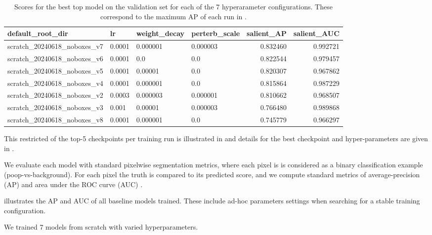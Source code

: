 \documentclass[10pt,twocolumn,letterpaper]{article}
\begin{document}
\begin{table*}[t]
\centering
\begin{tabular}{llllrr}
\toprule
                       default\_root\_dir &      lr & weight\_decay & perterb\_scale &  salient\_AP &  salient\_AUC \\
\midrule
scratch\_20240618\_noboxes\_v7 &  0.0001 &     0.000001 &      0.000003 &    0.832460 &     0.992721 \\
scratch\_20240618\_noboxes\_v6 &  0.0001 &          0.0 &           0.0 &    0.822544 &     0.979457 \\
scratch\_20240618\_noboxes\_v5 &  0.0001 &      0.00001 &           0.0 &    0.820307 &     0.967862 \\
scratch\_20240618\_noboxes\_v4 &  0.0001 &     0.000001 &           0.0 &    0.815864 &     0.987229 \\
scratch\_20240618\_noboxes\_v2 &  0.0003 &     0.000003 &      0.000001 &    0.810662 &     0.968507 \\
scratch\_20240618\_noboxes\_v3 &   0.001 &      0.00001 &      0.000003 &    0.766480 &     0.989868 \\
scratch\_20240618\_noboxes\_v8 &  0.0001 &     0.000001 &           0.0 &    0.745779 &     0.966297 \\
\bottomrule
\end{tabular}
\caption{
    Scores for the best top model on the validation set for each of the 7 hyperarameter configurations. These correspond to the maximum AP 
    of each run in .
}
\label{tab:parameters_and_results}
\end{table*}


This restricted of the top-5 checkpoints per training run is illustrated in  and details for the best checkpoint and hyper-parameters are given in .

We evaluate each model with standard pixelwise segmentation metrics, where each
pixel is is considered as a binary classification example (poop-vs-background).
For each pixel the truth is compared to its predicted score, and we compute
standard metrics of average-precision (AP) and  area under the ROC curve (AUC)
\cite{powers_evaluation_2011}.

 illustrates the AP and AUC of all baseline models trained.
These include ad-hoc parameters settings when searching for a stable training
configuration.


We trained 7 models from scratch with varied hyperparameters.
\end{document}
